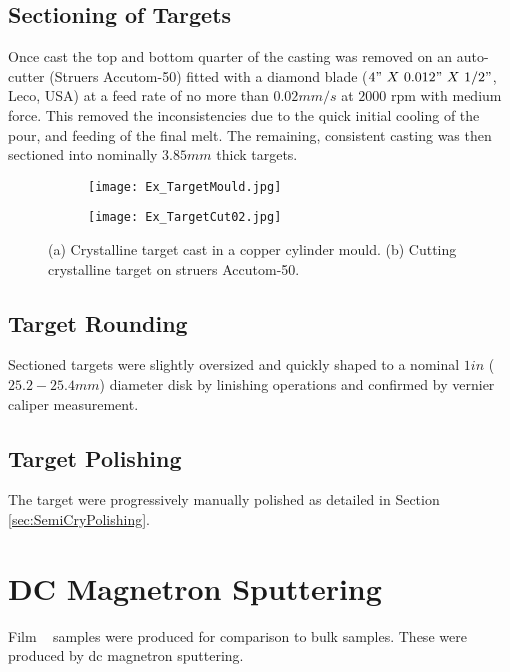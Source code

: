 \documentclass[a4paper,12pt,oneside]{report}%
\begin{document}
\subsection{Sectioning of Targets}
Once cast the top and bottom quarter of the casting was removed on an auto-cutter (Struers Accutom-50) fitted with a diamond blade ($4"~ X~ 0.012"~ X~ 1/2"$, Leco, USA) at a feed rate of no more than $0.02 mm/s$ at $2000$ \acrshort{rpm} with medium force. This removed the inconsistencies due to the quick initial cooling of the pour, and feeding of the final melt. The remaining, consistent casting was then sectioned into nominally $3.85 mm$ thick targets.

\begin{figure}[htbp]
	\begin{subfigure}[htbp]{0.463\textwidth}
		\texttt{[image: Ex\_TargetMould.jpg]}
		\caption{}
		\label{fig:Xtal_Casting_Target}
	\end{subfigure}
	\begin{subfigure}[htbp]{0.45\textwidth}
		\texttt{[image: Ex\_TargetCut02.jpg]}
		\caption{}
		\label{fig:Xtal_Cutting_Target}
	\end{subfigure}
	\caption{(a) Crystalline target cast in a copper cylinder mould. (b) Cutting crystalline target on struers Accutom-50.}%
	\label{fig:Xtal_Target}
\end{figure}

\subsection{Target Rounding}
Sectioned targets were slightly oversized and quickly shaped to a nominal $1 in$ ($25.2 - 25.4 mm$) diameter disk by linishing operations and confirmed by vernier caliper measurement.

\subsection{Target Polishing}
The target were progressively manually polished as detailed in Section \ref{sec:SemiCryPolishing}.

\section{DC Magnetron Sputtering}
Film \MgZnCa~ samples were produced for comparison to bulk samples. These were produced by \acrshort{dc} magnetron sputtering.
\end{document}
